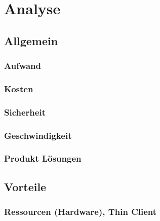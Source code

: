 

\chapter{Analyse}

\section{Allgemein}


\subsection{Aufwand}

\subsection{Kosten}

\subsection{Sicherheit}

\subsection{Geschwindigkeit}

\subsection{Produkt Lösungen}



\section{Vorteile}

\subsection{Ressourcen (Hardware), Thin Client}

